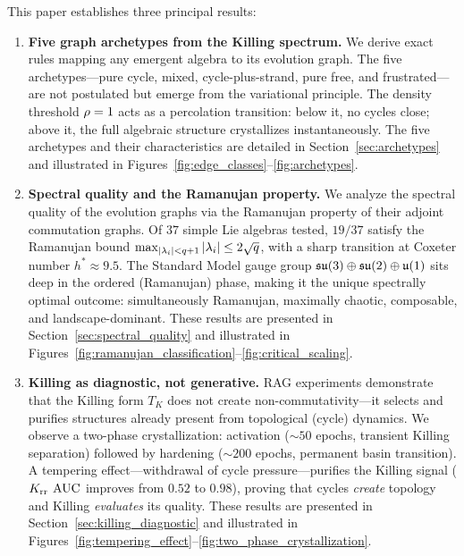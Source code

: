 This paper establishes three principal results:

\begin{enumerate}
    \item \textbf{Five graph archetypes from the Killing spectrum.} We derive exact rules mapping any emergent algebra to its evolution graph. The five archetypes---pure cycle, mixed, cycle-plus-strand, pure free, and frustrated---are not postulated but emerge from the variational principle. The density threshold $\rho = 1$ acts as a percolation transition: below it, no cycles close; above it, the full algebraic structure crystallizes instantaneously. The five archetypes and their characteristics are detailed in Section~\ref{sec:archetypes} and illustrated in Figures~\ref{fig:edge_classes}--\ref{fig:archetypes}.
    
    \item \textbf{Spectral quality and the Ramanujan property.} We analyze the spectral quality of the evolution graphs via the Ramanujan property of their adjoint commutation graphs. Of $37$ simple Lie algebras tested, $19/37$ satisfy the Ramanujan bound $\max_{|\lambda_i| < q+1} |\lambda_i| \leq 2\sqrt{q}$, with a sharp transition at Coxeter number $h^* \approx 9.5$. The Standard Model gauge group $\mathfrak{su}(3) \oplus \mathfrak{su}(2) \oplus \mathfrak{u}(1)$ sits deep in the ordered (Ramanujan) phase, making it the unique spectrally optimal outcome: simultaneously Ramanujan, maximally chaotic, composable, and landscape-dominant. These results are presented in Section~\ref{sec:spectral_quality} and illustrated in Figures~\ref{fig:ramanujan_classification}--\ref{fig:critical_scaling}.
    
    \item \textbf{Killing as diagnostic, not generative.} RAG experiments demonstrate that the Killing form $T_K$ does not create non-commutativity---it selects and purifies structures already present from topological (cycle) dynamics. We observe a two-phase crystallization: activation ($\sim\!50$ epochs, transient Killing separation) followed by hardening ($\sim\!200$ epochs, permanent basin transition). A tempering effect---withdrawal of cycle pressure---purifies the Killing signal ($K_{\mathrm{rr}}$ $\mathrm{AUC}$ improves from $0.52$ to $0.98$), proving that cycles \emph{create} topology and Killing \emph{evaluates} its quality. These results are presented in Section~\ref{sec:killing_diagnostic} and illustrated in Figures~\ref{fig:tempering_effect}--\ref{fig:two_phase_crystallization}.
\end{enumerate}

